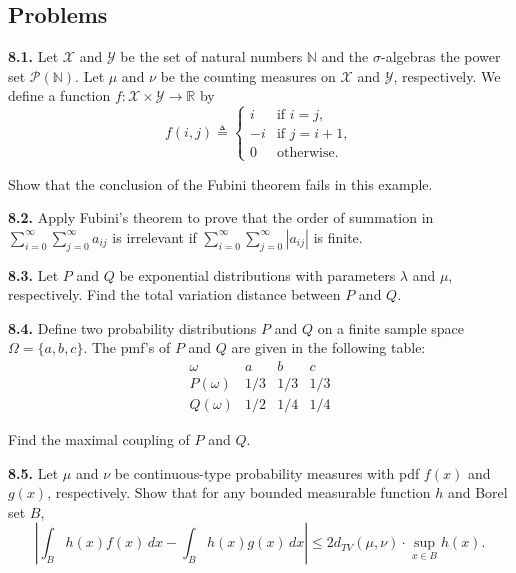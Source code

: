 \subsection*{Problems}

\textbf{8.1.} Let $\mathcal{X}$ and $\mathcal{Y}$ be the set of natural numbers $\mathbb{N}$ and the $\sigma$-algebras the power set $\mathcal{P}(\mathbb{N})$. Let $\mu$ and $\nu$ be the counting measures on $\mathcal{X}$ and $\mathcal{Y}$, respectively. We define a function $f:\mathcal{X}\times \mathcal{Y}\to \mathbb{R}$ by
\[
f(i,j)\triangleq
\begin{cases}
i & \text{if } i=j,\\
-i & \text{if } j=i+1,\\
0 & \text{otherwise.}
\end{cases}
\]

Show that the conclusion of the Fubini theorem fails in this example.

\textbf{8.2.} Apply Fubini's theorem to prove that the order of summation in $\sum_{i=0}^{\infty}\sum_{j=0}^{\infty} a_{ij}$ is irrelevant if $\sum_{i=0}^{\infty}\sum_{j=0}^{\infty} |a_{ij}|$ is finite.

\textbf{8.3.} Let $P$ and $Q$ be exponential distributions with parameters $\lambda$ and $\mu$, respectively. Find the total variation distance between $P$ and $Q$.

\textbf{8.4.} Define two probability distributions $P$ and $Q$ on a finite sample space $\Omega=\{a,b,c\}$. The pmf's of $P$ and $Q$ are given in the following table:
\[
\begin{array}{c|ccc}
\omega & a & b & c\\
\hline
P(\omega) & 1/3 & 1/3 & 1/3\\
Q(\omega) & 1/2 & 1/4 & 1/4
\end{array}
\]

Find the maximal coupling of $P$ and $Q$.

\textbf{8.5.} Let $\mu$ and $\nu$ be continuous-type probability measures with pdf $f(x)$ and $g(x)$, respectively. Show that for any bounded measurable function $h$ and Borel set $B$,
\[
\left|
\int_B h(x)f(x)\, dx - \int_B h(x)g(x)\, dx
\right|
\le
2d_{TV}(\mu,\nu)\cdot \sup_{x\in B} h(x).
\]

